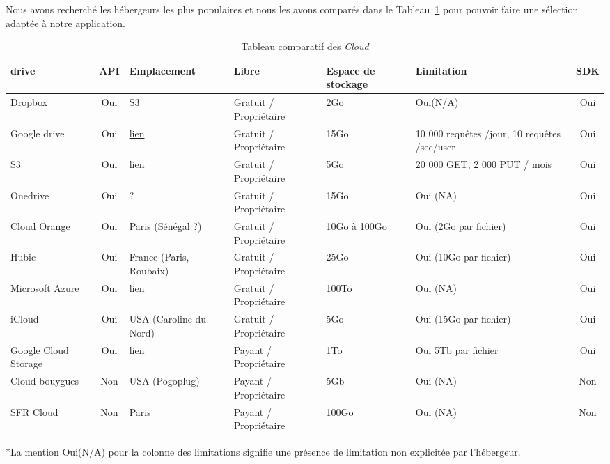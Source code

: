 \documentclass[10pt]{article}
\begin{document}
Nous avons recherché les hébergeurs les plus populaires et nous les avons comparés dans le Tableau~\ref{tab:comparC} pour pouvoir faire une sélection adaptée à notre application.

\begin{table}[!h] \caption{Tableau comparatif des \textit{Cloud} \label{tab:comparC}}
\renewcommand{\arraystretch}{1.5} \begin{center}
\begin{tabular}{|m{1in}|c|m{1in}|m{1in}|m{1in}|m{1in}|c|} \hline \bf\centering
drive & \bf API & \bf Emplacement & \bf Libre & \bf\centering Espace de
stockage & \bf Limitation & \bf SDK\\ \hline \centering Dropbox & Oui & S3 &
Gratuit / Propriétaire & 2Go & Oui(N/A) & Oui \\ \hline \centering Google drive
& Oui  &
\href{http://www.google.com/about/datacenters/inside/locations/index.html}{lien}
& Gratuit / Propriétaire & 15Go & 10 000 requêtes /jour, 10 requêtes /sec/user
& Oui \\ \hline \centering S3 & Oui  &
\href{http://aws.amazon.com/fr/about-aws/global-infrastructure/}{lien} &
Gratuit / Propriétaire & 5Go & 20 000 GET, 2 000 PUT / mois & Oui \\ \hline
\centering Onedrive & Oui  & ? & Gratuit / Propriétaire & 15Go & Oui (NA) & Oui
\\ \hline \centering Cloud Orange & Oui  & Paris (Sénégal ?) & Gratuit /
Propriétaire & 10Go à 100Go & Oui (2Go par fichier) & Oui \\ \hline \centering
Hubic & Oui  & France (Paris, Roubaix) & Gratuit / Propriétaire & 25Go & Oui
(10Go par fichier) & Oui \\ \hline \centering Microsoft Azure & Oui  &
\href{http://azure.microsoft.com/en-us/regions/}{lien} & Gratuit / Propriétaire
& 100To & Oui (NA) & Oui \\ \hline \centering iCloud & Oui  & USA (Caroline du
Nord) & Gratuit / Propriétaire & 5Go & Oui (15Go par fichier) & Oui \\ \hline
\centering Google Cloud Storage & Oui  &
\href{http://www.google.com/about/datacenters/inside/locations/index.html}{lien}
& Payant  / Propriétaire & 1To & Oui 5Tb par fichier & Oui \\ \hline \centering
Cloud bouygues & Non  & USA (Pogoplug) & Payant  / Propriétaire & 5Gb & Oui
(NA) & Non \\ \hline \centering SFR Cloud & Non & Paris & Payant / Propriétaire
& 100Go & Oui (NA) & Non \\ \hline \end{tabular} \end{center} \end{table} *La
mention Oui(N/A) pour la colonne des limitations signifie une présence de
limitation non explicitée par l'hébergeur.\\
\end{document}

